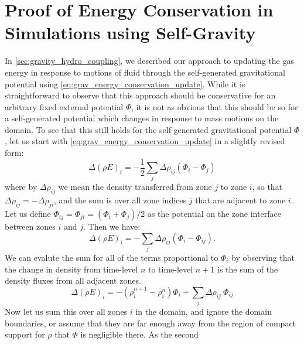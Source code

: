 \documentclass[12pt]{article}
\begin{document}
\newpage




\newpage

\appendix



\section{Proof of Energy Conservation in Simulations using Self-Gravity}
\label{app:gravity}

In \autoref{sec:gravity_hydro_coupling}, we described our approach to updating the gas energy
in response to motions of fluid through the self-generated gravitational potential using 
\autoref{eq:grav_energy_conservation_update}. While it is straightforward to observe that this approach
should be conservative for an arbitrary fixed external potential $\Phi$, it is not as obvious that this
should be so for a self-generated potential which changes in response to mass motions on the domain. To
see that this still holds for the self-generated gravitational potential $\Phi$, let us start with 
\autoref{eq:grav_energy_conservation_update} in a slightly revised form:
\begin{equation}
  \Delta(\rho E)_i = -\frac{1}{2}\sum_{j} \Delta\rho_{ij}(\Phi_i - \Phi_{j}) \label{eq:grav_energy_conservation_update_revised}
\end{equation}
where by $\Delta \rho_{ij}$ we mean the density transferred from zone $j$ to zone $i$, so that
$\Delta \rho_{ij} = - \Delta \rho_{ji}$, and the sum is over all zone indices $j$ that are adjacent
to zone $i$. Let us define $\Phi_{ij} = \Phi_{ji} = (\Phi_{i} + \Phi_{j}) / 2$ as the potential on the
zone interface between zones $i$ and $j$. Then we have:
\begin{equation}
  \Delta(\rho E)_i = -\sum_{j} \Delta\rho_{ij}(\Phi_i - \Phi_{ij}).
\end{equation}
We can evalute the sum for all of the terms proportional to $\Phi_i$ by observing that the change in
density from time-level $n$ to time-level $n+1$ is the sum of the density fluxes from all adjacent zones.
\begin{equation*}
  \Delta(\rho E)_i = - (\rho_i^{n+1} - \rho_i^{n}) \Phi_i + \sum_{j}\Delta \rho_{ij} \ \Phi_{ij}
\end{equation*}
Now let us sum this over all zones $i$ in the domain, and ignore the domain boundaries, or assume that they are
far enough away from the region of compact support for $\rho$ that $\Phi$ is negligible there. As the second
\end{document}
